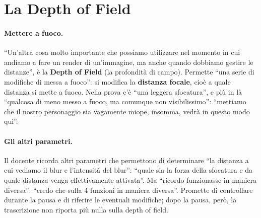 \section{La Depth of Field}
\label{ue16:sec:dof}

\paragraph{Mettere a fuoco.} ``Un'altra cosa molto importante che possiamo utilizzare nel
momento in cui andiamo a fare un render di un'immagine, ma anche quando dobbiamo gestire le
distanze'', è la \textbf{Depth of Field} (la profondità di campo). Permette ``una serie di
modifiche di messa a fuoco'': si modifica la \textbf{distanza focale}, cioè a quale distanza si
mette a fuoco. Nella prova c'è ``una leggera sfocatura'', e più in là ``qualcosa di meno messo a
fuoco, ma comunque non visibilissimo'': ``mettiamo che il nostro personaggio sia vagamente
miope, insomma, vedrà in questo modo qui''.

\paragraph{Gli altri parametri.} Il docente ricorda altri parametri che permettono di
determinare ``la distanza a cui vediamo il blur e l'intensità del blur'': ``quale sia la forza
della sfocatura e da quale distanza venga effettivamente attivata''. Ma ``ricordo funzionasse
in maniera diversa'': ``credo che sulla 4 funzioni in maniera diversa''. Promette di
controllare durante la pausa e di riferire le eventuali modifiche; dopo la pausa, però, la
trascrizione non riporta più nulla sulla depth of field.

